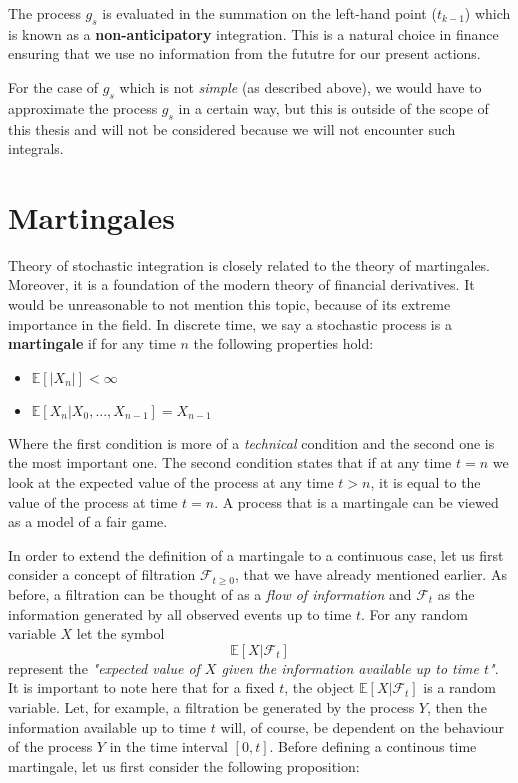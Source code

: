\documentclass[times, utf8, diplomski]{fer}
\begin{document}
\noindent The process $g_s$ is evaluated in the summation on the left-hand point ($t_{k-1}$) which is known as a \textbf{non-anticipatory} integration. This is a natural choice in finance ensuring that we use no information from the fututre for our present actions.

\noindent For the case of $g_s$ which is not \textit{simple} (as described above), we would have to approximate the process $g_s$ in a certain way, but this is outside of the scope of this thesis and will not be considered because we will not encounter such integrals.

\section{Martingales}
Theory of stochastic integration is closely related to the theory of martingales. Moreover, it is a foundation of the modern theory of financial derivatives. It would be unreasonable to not mention this topic, because of its extreme importance in the field. In discrete time, we say a stochastic process is a \textbf{martingale} if for any time $n$ the following properties hold: \vspace{0.5cm}

\begin{center}
	\begin{itemize}
		\item $\mathbb{E}[|X_n|] < \infty$
		\item $\mathbb{E}[X_n | X_0, ..., X_{n-1}] = X_{n-1}$
	\end{itemize}
\end{center}

\noindent Where the first condition is more of a \textit{technical} condition and the second one is the most important one. The second condition states that if at any time $t=n$ we look at the expected value of the process at any time $t>n$, it is equal to the value of the process at time $t=n$. A process that is a martingale can be viewed as a model of a fair game.

\noindent In order to extend the definition of a martingale to a continuous case, let us first consider a concept of filtration ${\mathcal{F}}_{t \ge 0}$, that we have already mentioned earlier. As before, a filtration can be thought of as a \textit{flow of information} and $\mathcal{F}_t$ as the information generated by all observed events up to time $t$. For any random variable $X$ let the symbol
$$\mathbb{E}[X|\mathcal{F}_t]$$
represent the \textit{"expected value of $X$ given the information available up to time $t$"}. It is important to note here that for a fixed $t$, the object $\mathbb{E}[X|\mathcal{F}_t]$ is a random variable. Let, for example, a filtration be generated by the process $Y$, then the information available up to time $t$ will, of course, be dependent on the behaviour of the process $Y$ in the time interval $[0,t]$. Before defining a continous time martingale, let us first consider the following proposition:
\end{document}

